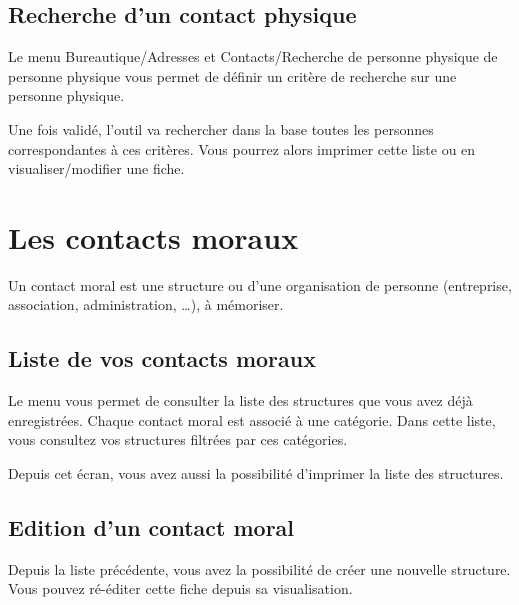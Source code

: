 \documentclass[a4paper,10pt,oneside,french]{sphinxmanual}
\begin{document}
\noindent{}


\subsection{Recherche d’un contact physique}
\label{\detokenize{contacts/individual:recherche-d-un-contact-physique}}
Le menu Bureautique/Adresses et Contacts/Recherche de personne physique de personne physique vous permet de définir un critère de recherche sur une personne physique.

Une fois validé, l’outil va rechercher dans la base toutes les personnes correspondantes à ces critères. Vous pourrez alors imprimer cette liste ou en visualiser/modifier une fiche.

\noindent{}


\section{Les contacts moraux}
\label{\detokenize{contacts/legal_entity:les-contacts-moraux}}\label{\detokenize{contacts/legal_entity::doc}}
Un contact moral est une structure ou d’une organisation de personne (entreprise, association, administration, …), à mémoriser.


\subsection{Liste de vos contacts moraux}
\label{\detokenize{contacts/legal_entity:liste-de-vos-contacts-moraux}}
Le menu  vous permet de consulter la liste des structures que vous avez déjà enregistrées. Chaque contact moral est associé à une catégorie. Dans cette liste, vous consultez vos structures filtrées par ces catégories.

Depuis cet écran, vous avez aussi la possibilité d’imprimer la liste des structures.

\noindent{}


\subsection{Edition d’un contact moral}
\label{\detokenize{contacts/legal_entity:edition-d-un-contact-moral}}
Depuis la liste précédente, vous avez la possibilité de créer une nouvelle structure. Vous pouvez ré-éditer cette fiche depuis sa visualisation.
\end{document}
